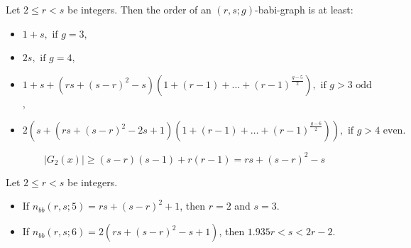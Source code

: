 \documentclass[10pt,a4paper]{amsart}
\begin{document}
\begin{theorem}\label{lowerboundbabigraph}
Let $2\leq r<s$ be integers.
Then the order of an $(r,s;g)$-babi-graph is at least:
\begin{itemize}
\item
$1+s, \text{ if } g =3,$
\item
$2s, \text{ if } g =4,$
\item
$1+s + 
(rs+(s-r)^2-s)(1+(r-1)+\ldots + (r-1)^{\frac{g-5}{2}}),
\text{ if } g>3 \text{ odd}$,  
\item
$2\left( s+
(rs+(s-r)^2-2s+1)(1+(r-1)+\ldots + (r-1)^{\frac{g-6}{2}})\right)  ,
\text{ if } g>4 \text{ even.}$
\end{itemize}

\end{theorem}

\begin{equation}
\label{tree-5}
|G_2(x)|\geq (s-r)(s-1)+r(r-1)=rs+(s-r)^2-s
\end{equation}

\begin{theorem}\label{equal-5-6}
Let $2\leq r<s$ be integers.  
\begin{itemize}
\item
If $n_{bb}(r,s;5)=rs+(s-r)^2+1$, then $r=2$ and $s=3$.
\item
If $n_{bb}(r,s;6)=2(rs+(s-r)^2-s+1)$, then $1.935r < s < 2r-2$.
\end{itemize}
\end{theorem}
\end{document}
